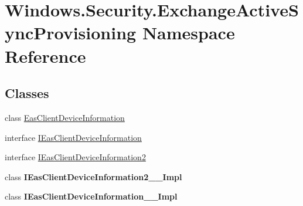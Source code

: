 \hypertarget{namespace_windows_1_1_security_1_1_exchange_active_sync_provisioning}{}\section{Windows.\+Security.\+Exchange\+Active\+Sync\+Provisioning Namespace Reference}
\label{namespace_windows_1_1_security_1_1_exchange_active_sync_provisioning}
\subsection*{Classes}
\begin{DoxyCompactItemize}
\item 
class \hyperlink{class_windows_1_1_security_1_1_exchange_active_sync_provisioning_1_1_eas_client_device_information}{Eas\+Client\+Device\+Information}
\item 
interface \hyperlink{interface_windows_1_1_security_1_1_exchange_active_sync_provisioning_1_1_i_eas_client_device_information}{I\+Eas\+Client\+Device\+Information}
\item 
interface \hyperlink{interface_windows_1_1_security_1_1_exchange_active_sync_provisioning_1_1_i_eas_client_device_information2}{I\+Eas\+Client\+Device\+Information2}
\item 
class {\bfseries I\+Eas\+Client\+Device\+Information2\+\_\+\+\_\+\+Impl}
\item 
class {\bfseries I\+Eas\+Client\+Device\+Information\+\_\+\+\_\+\+Impl}
\end{DoxyCompactItemize}
